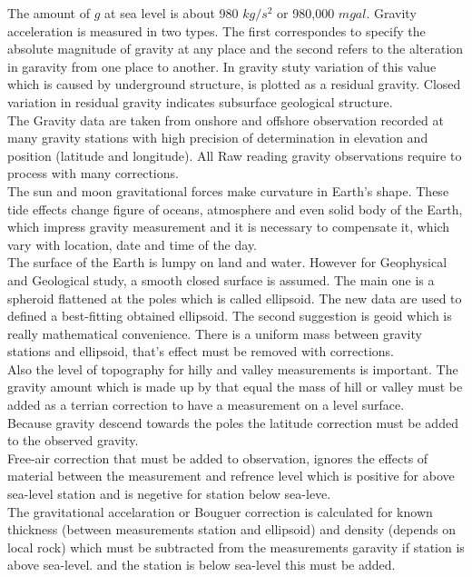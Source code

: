 The amount of $g$ at sea level is about 980 $kg/s^2$ or 980,000 $mgal$. Gravity acceleration is measured in two types. The first correspondes to specify the absolute magnitude of gravity at any place and the second refers to the alteration in garavity from one place to another. In gravity stuty variation of this value which is caused by underground structure, is plotted as a residual gravity. Closed variation in residual gravity indicates subsurface geological structure.\\
The Gravity data are taken from onshore and offshore observation recorded at many gravity stations with high precision of determination in elevation and position (latitude and longitude). All Raw reading gravity observations require to process with many corrections.\\

The sun and moon gravitational forces make curvature in Earth's shape. These tide effects change figure of oceans, atmosphere and even solid body of the Earth, which impress gravity measurement and it is necessary to compensate it, which vary with location, date and time of the day.\\
The surface of the Earth is lumpy on land and water. However for Geophysical and Geological study, a smooth closed surface is assumed. The main one is a spheroid flattened at the poles which is called ellipsoid. The new data are used to defined a best-fitting obtained ellipsoid. The second suggestion is geoid which is really mathematical convenience. There is a uniform mass between gravity stations and ellipsoid, that's effect must be removed with corrections.\\ 
Also the level of topography for hilly and valley measurements is important. The gravity amount which is made up by that equal the mass of hill or valley must be added as a terrian correction to have a measurement on a level surface.\\
Because gravity descend towards the poles the latitude correction must be added to the observed gravity.\\
Free-air correction that must be added to observation, ignores the effects of material between the measurement and refrence level which is positive for above sea-level station and is negetive for station below sea-leve.\\
The gravitational accelaration or Bouguer correction is calculated for known thickness (between measurements station and ellipsoid) and density (depends on local rock) which must be subtracted from the measurements garavity if station is above sea-level. and the station is below sea-level this must be added.\\

